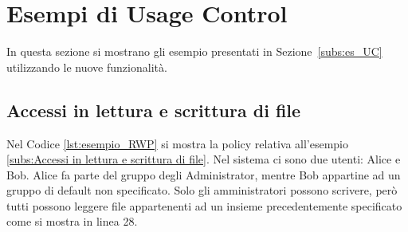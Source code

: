 \section{Esempi di Usage Control}
\label{sec:Esempi}
In questa sezione si mostrano gli esempio presentati in Sezione~\ref{subs:es_UC} utilizzando le nuove funzionalità.
\subsection{Accessi in lettura e scrittura di file}
\label{sub:RW_Code_Sec}
Nel Codice \ref{lst:esempio_RWP} si mostra la policy relativa all'esempio \ref{subs:Accessi in lettura e scrittura di file}.
Nel sistema ci sono due utenti: Alice e Bob. Alice fa parte del gruppo degli Administrator,
mentre Bob appartine ad un gruppo di default non specificato. Solo gli amministratori possono scrivere,
però tutti possono leggere file appartenenti ad un insieme precedentemente specificato come si mostra in linea 28.

